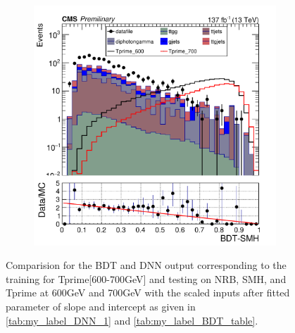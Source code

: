 \begin{figure}[H]
\begin{subfigure}[b]{0.47\textwidth}
         \includegraphics[width=\textwidth]{BDT_Output/Stacked_plot_BDT_600-700_with_diphoton_cuts_inputs.pdf}
         \label{fig:three sin x}
     \end{subfigure}
    \hfill
     \label{fig:Comaprision_4}
     \caption{Comparision for the BDT and DNN output corresponding to the training for Tprime[600-700GeV] and testing on NRB, SMH, and Tprime at 600GeV and 700GeV with the scaled inputs after fitted parameter of slope and intercept as given in \autoref{tab:my_label_DNN_1} and \autoref{tab:my_label_BDT_table}.}
\end{figure}






